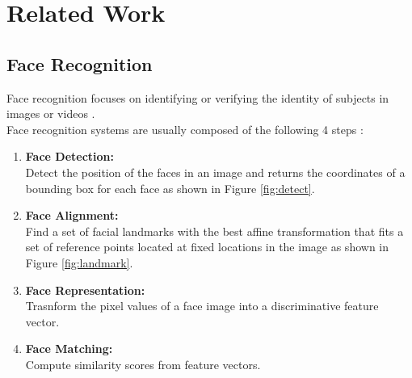 \documentclass[12pt,english]{article}
\begin{document}
\section{Related Work}	

\subsection{Face Recognition}

\quad
Face recognition focuses on identifying or verifying the identity of subjects in images or videos \cite{trigueros}.\\

Face recognition systems are usually composed of the following 4 steps \cite{trigueros}: 

\begin{enumerate}
  \item \textbf{Face Detection:}\\ Detect the position of the faces in an image and returns the coordinates of a bounding box for each face as shown in Figure \ref{fig:detect}.
  \item \textbf{Face Alignment:} \\ Find a set of facial landmarks with the best affine transformation that fits a set of reference points located at fixed locations in the image as shown in Figure \ref{fig:landmark}.
  \item \textbf{Face Representation:} \\ Trasnform the pixel values of a face image into a discriminative feature vector.
  \item \textbf{Face Matching:} \\ Compute similarity scores from feature vectors.
\end{enumerate} 
 
\end{document}
